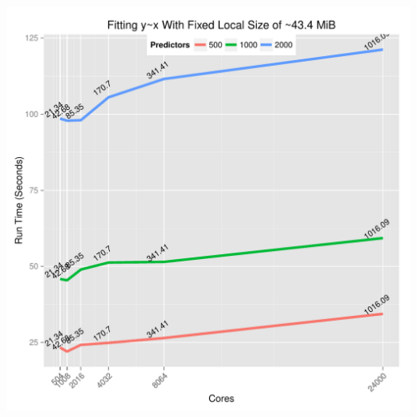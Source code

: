 \begin{frame}
  \begin{block}{}
  \begin{center}
    \includegraphics[height=.88\textheight]{../common/pics/lmfit2}
  \end{center}
  \end{block}
\end{frame}